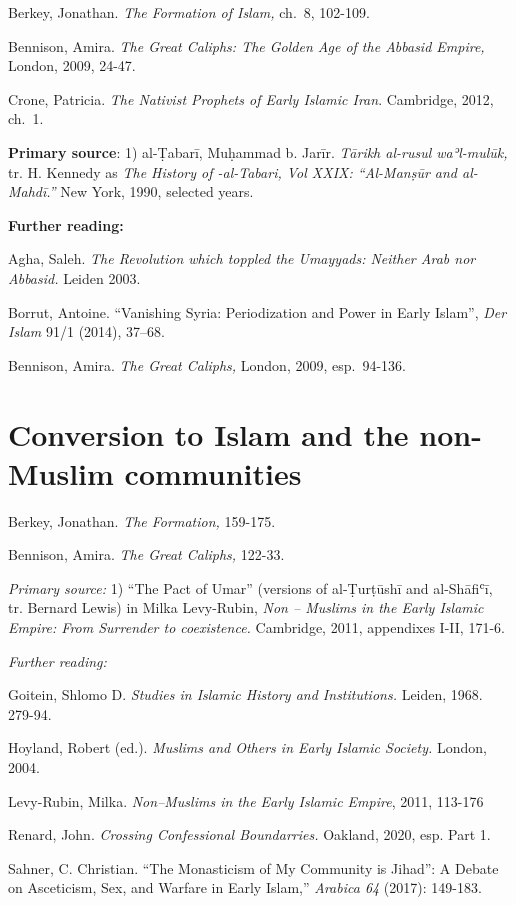 \documentclass[
]{book}
\begin{document}
Berkey, Jonathan. \emph{The Formation of Islam,} ch.~8, 102-109.

Bennison, Amira. \emph{The Great Caliphs: The Golden Age of the Abbasid
Empire,} London, 2009, 24-47.

Crone, Patricia. \emph{The Nativist Prophets of Early Islamic Iran}.
Cambridge, 2012, ch.~1.

\textbf{Primary source}: 1) al-Ṭabarī, Muḥammad b. Jarīr. \emph{Tārikh al-rusul
waʾl-mulūk,} tr. H. Kennedy as \emph{The History of -al-Tabari, Vol XXIX:
``Al-Manṣūr and al-Mahdī.''} New York, 1990, selected years.

\textbf{Further reading:}

Agha, Saleh. \emph{The Revolution which toppled the Umayyads: Neither Arab
nor Abbasid.} Leiden 2003.

Borrut, Antoine. ``Vanishing Syria: Periodization and Power in Early
Islam'', \emph{Der Islam} 91/1 (2014), 37--68.

Bennison, Amira. \emph{The Great Caliphs,} London, 2009, esp.~94-136.

\hypertarget{conversion-to-islam-and-the-non-muslim-communities}{%
\chapter{Conversion to Islam and the non-Muslim communities}\label{conversion-to-islam-and-the-non-muslim-communities}}

Berkey, Jonathan. \emph{The Formation,} 159-175.

Bennison, Amira. \emph{The Great Caliphs,} 122-33.

\emph{Primary source:} 1) ``The Pact of Umar'' (versions of al-Ṭurṭūshī and
al-Shāfiʿī, tr. Bernard Lewis) in Milka Levy-Rubin, \emph{Non -- Muslims in
the Early Islamic Empire: From Surrender to coexistence.} Cambridge,
2011, appendixes I-II, 171-6.

\emph{Further reading:}

Goitein, Shlomo D. \emph{Studies in Islamic History and Institutions.}
Leiden, 1968. 279-94.

Hoyland, Robert (ed.). \emph{Muslims and Others in Early Islamic Society.}
London, 2004.

Levy-Rubin, Milka. \emph{Non--Muslims in the Early Islamic Empire}, 2011,
113-176

Renard, John. \emph{Crossing Confessional Boundarries.} Oakland, 2020, esp.
Part 1.

Sahner, C. Christian. ``The Monasticism of My Community is Jihad'': A
Debate on Asceticism, Sex, and Warfare in Early Islam,'' \emph{Arabica 64}
(2017): 149-183.
\end{document}
